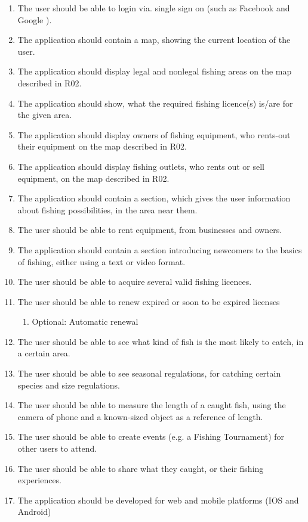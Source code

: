 \begin{enumerate}[R1]
	\item The user should be able to login via. single sign on (such as Facebook and Google \cite{oauth}).
	\item The application should contain a map, showing the current location of the user.
	\item The application should display legal and nonlegal fishing areas on the map described in R02.
	\item The application should show, what the required fishing licence(s) is/are for the given area.
	\item The application should display owners of fishing equipment, who rents-out their	equipment on the map described in R02.
	\item The application should display fishing outlets, who rents out or sell equipment, on	the map described in R02.
	\item The application should contain a section, which gives the user information about fishing possibilities, in the area near them.
	\item The user should be able to rent equipment, from businesses and owners.
	\item The application should contain a section introducing newcomers to the basics of fishing, either using a text or video format.
	\item The user should be able to acquire several valid fishing licences.
	\item The user should be able to renew expired or soon to be expired licenses \begin{enumerate}[R11.1]
	\item Optional: Automatic renewal \end{enumerate}
	\item The user should be able to see what kind of fish is the most likely to catch, in a certain area.
	\item The user should be able to see seasonal regulations, for catching certain species and size regulations.
	\item The user should be able to measure the length of a caught fish, using the camera of phone and a known-sized object as a reference of length.
	\item The user should be able to create events (e.g. a Fishing Tournament) for other users to attend.
	\item The user should be able to share what they caught, or their fishing experiences.
	\item The application should be developed for web and mobile platforms (IOS and Android)
\end{enumerate}